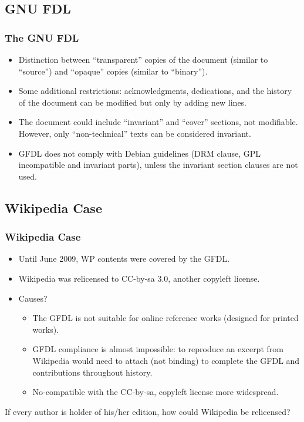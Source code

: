 \documentclass{beamer}
\begin{document}
\subsection{GNU FDL}
\begin{frame}
\frametitle{The GNU FDL}

\begin{itemize}
\item Distinction between ``\alert{transparent}'' copies of the
  document (similar to ``source'') and ``\alert{opaque}'' copies (similar to
  ``binary'').
\item Some additional restrictions: acknowledgments,
  dedications, and the history of the document can be modified but
  only by adding new lines.
\item The document could include ``\alert{invariant}'' and ``cover'' sections, not
  modifiable. However, only ``non-technical'' texts can be considered
  invariant.
\item \alert{GFDL does not comply} with Debian guidelines (DRM clause, GPL incompatible and 
invariant parts), \alert{unless} the invariant section clauses are not used. 

\end{itemize}


\end{frame}


\subsection{Wikipedia Case}
\begin{frame}
\frametitle{Wikipedia Case}

\begin{itemize}
\item Until June 2009, WP contents were covered by the GFDL.
\item Wikipedia was relicensed to CC-by-sa 3.0, another copyleft license.
\item Causes? 

\pause

\small
	\begin{itemize}
		\item The GFDL is not suitable for online reference works (designed for printed works). 
		\item GFDL compliance is almost impossible: to reproduce an excerpt from Wikipedia would need to attach (not binding) to complete the GFDL and contributions throughout history.
		\item No-compatible with the CC-by-sa, copyleft license more widespread.
	\end{itemize}

\end{itemize}

\pause
\begin{center}
\alert{If every author is holder of his/her edition, how could Wikipedia be relicensed?}
\end{center}

\end{frame}
\end{document}
